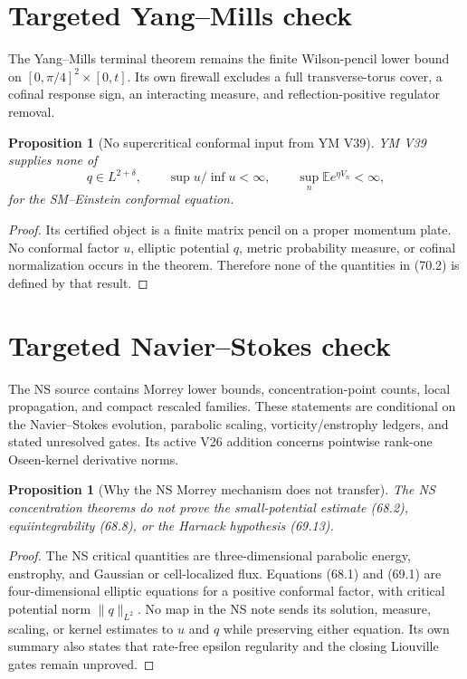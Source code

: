 \documentclass[11pt]{article}
\newtheorem{proposition}[theorem]{Proposition}
\theoremstyle{remark}
\begin{document}
\section{Targeted Yang--Mills check}

The Yang--Mills terminal theorem remains the finite
Wilson-pencil lower bound on
\([0,\pi/4]^2\times[0,t]\).  Its own firewall excludes a full
transverse-torus cover, a cofinal response sign, an interacting
measure, and reflection-positive regulator removal.

\begin{proposition}[No supercritical conformal input from YM V39]
\label{prop:v15v70-ym}
YM V39 supplies none of
\[
 q\in L^{2+\delta},\qquad
 \sup u/\inf u<\infty,\qquad
 \sup_n\mathbb E e^{\eta V_n}<\infty,                 \tag{70.2}
\]
for the SM--Einstein conformal equation.
\end{proposition}

\begin{proof}
Its certified object is a finite matrix pencil on a proper
momentum plate.  No conformal factor \(u\), elliptic potential \(q\),
metric probability measure, or cofinal normalization occurs in
the theorem.  Therefore none of the quantities in (70.2) is
defined by that result.
\end{proof}

\section{Targeted Navier--Stokes check}

The NS source contains Morrey lower bounds, concentration-point
counts, local propagation, and compact rescaled families.  These
statements are conditional on the Navier--Stokes evolution,
parabolic scaling, vorticity/enstrophy ledgers, and stated
unresolved gates.  Its active V26 addition concerns pointwise
rank-one Oseen-kernel derivative norms.

\begin{proposition}[Why the NS Morrey mechanism does not transfer]
\label{prop:v15v70-ns}
The NS concentration theorems do not prove the small-potential
estimate (68.2), equiintegrability (68.8), or the Harnack hypothesis
(69.13).
\end{proposition}

\begin{proof}
The NS critical quantities are three-dimensional parabolic energy,
enstrophy, and Gaussian or cell-localized flux.  Equations
(68.1) and (69.1) are four-dimensional elliptic equations for a
positive conformal factor, with critical potential norm
\(\|q\|_{L^2}\).  No map in the NS note sends its solution,
measure, scaling, or kernel estimates to \(u\) and \(q\) while
preserving either equation.  Its own summary also states that
rate-free epsilon regularity and the closing Liouville gates remain
unproved.
\end{proof}
\end{document}
